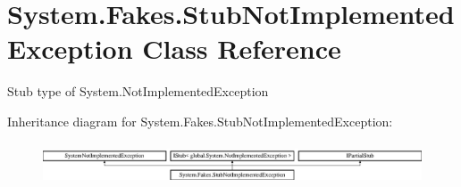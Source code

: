\hypertarget{class_system_1_1_fakes_1_1_stub_not_implemented_exception}{\section{System.\-Fakes.\-Stub\-Not\-Implemented\-Exception Class Reference}
\label{class_system_1_1_fakes_1_1_stub_not_implemented_exception}
}


Stub type of System.\-Not\-Implemented\-Exception 


Inheritance diagram for System.\-Fakes.\-Stub\-Not\-Implemented\-Exception\-:\begin{figure}[H]
\begin{center}
\leavevmode
\includegraphics[height=1.257015cm]{class_system_1_1_fakes_1_1_stub_not_implemented_exception}
\end{center}
\end{figure}
